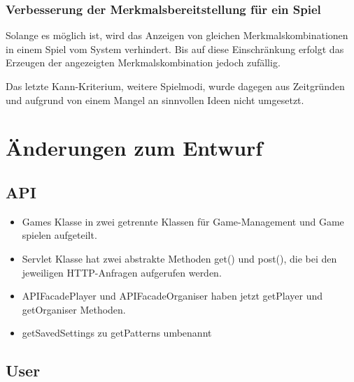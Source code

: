 \documentclass[a4paper]{scrreprt}
\begin{document}
\subsection{Verbesserung der Merkmalsbereitstellung für ein Spiel}
Solange es möglich ist, wird das Anzeigen von gleichen Merkmalskombinationen in einem Spiel vom System verhindert. Bis auf diese Einschränkung erfolgt das Erzeugen der angezeigten Merkmalskombination jedoch zufällig.



\hspace{1cm}

Das letzte Kann-Kriterium, weitere Spielmodi, wurde dagegen aus Zeitgründen und aufgrund von einem Mangel an sinnvollen Ideen nicht umgesetzt.

\chapter{Änderungen zum Entwurf}
\section{API}
\begin{itemize}
    \item Games Klasse in zwei getrennte Klassen für Game-Management und Game spielen aufgeteilt.
    \item Servlet Klasse hat zwei abstrakte Methoden get() und post(), die bei den jeweiligen HTTP-Anfragen aufgerufen werden.
    \item APIFacadePlayer und APIFacadeOrganiser haben jetzt getPlayer und getOrganiser Methoden.
    \item getSavedSettings zu getPatterns umbenannt
\end{itemize}

\section{User}
\end{document}
